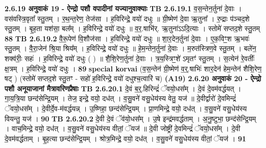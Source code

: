 \documentclass[17pt]{extarticle}
\begin{document}
                \textbf{ 2.6.19    अनुवाकं   19 - ऐन्द्रो पशौ वपादीनां यज्यानुवाक्याः} \newline
                                \textbf{ TB 2.6.19.1} \newline
                  व॒स॒न्तेन॒र्तुना॑ दे॒वाः । वस॑वस्त्रि॒वृता᳚ स्तु॒तम् । र॒थ॒न्त॒रेण॒ तेज॑सा । ह॒विरिन्द्रे॒ वयो॑ दधुः ॥ ग्री॒ष्मेण॑ दे॒वा ऋ॒तुना᳚ । रु॒द्राः प॑ञ्चद॒शे स्तु॒तम् । बृ॒ह॒ता यश॑सा॒ बल᳚म् । ह॒विरिन्द्रे॒ वयो॑ दधुः ॥ व॒र॒.षाभि॑र्. ऋ॒तुना॑ऽऽदि॒त्याः । स्तोमे॑ सप्तद॒शे स्तु॒तम् \textbf{ 88} \newline
                  \newline
                                \textbf{ TB 2.6.19.2} \newline
                  वै॒रू॒पेण॑ वि॒शौज॑सा । ह॒विरिन्द्रे॒ वयो॑ दधुः ॥ शा॒र॒देन॒र्तुना॑ दे॒वाः । ए॒क॒विꣳ॒॒श ऋ॒भवः॑ स्तु॒तम् । वै॒रा॒जेन॑ श्रि॒या श्रिय᳚म् । ह॒विरिन्द्रे॒ वयो॑ दधुः ॥ हे॒म॒न्तेन॒र्तुना॑ दे॒वाः । म॒रुत॑स्त्रिण॒वे स्तु॒तम् । बले॑न॒ शक्व॑रीः॒ सहः॑ । ह॒विरिन्द्रे॒ वयो॑ दधुः ( ) ॥ शै॒शि॒रेण॒र्तुना॑ दे॒वाः । त्र॒य॒स्त्रिꣳ॒॒शे॑ ऽमृतꣳ॑ स्तु॒तम् । स॒त्येन॑ रे॒वतीः᳚ क्ष॒त्रम् । ह॒विरिन्द्रे॒ वयो॑ दधुः । \textbf{ 89} \newline
                  \newline
                                                        \textbf{special korvai} \newline
              (व॒स॒न्तेन॑ ग्री॒ष्मेण॑ व॒र्॒.षाभिः॑ शार॒देन॑ हेम॒न्तेन॑ शैशि॒रेण॒ षट् ) \newline
                                (स्तोमे॑ सप्तद॒शे स्तु॒तꣳ - सहो॑ ह॒विरिन्द्रे॒ वयो॑ दधुश्च॒त्वारि॑ च) \textbf{(A19)} \newline \newline
                \textbf{ 2.6.20    अनुवाकं   20 - ऐन्द्रो पशौ अनूयाजानां मैत्रावरिणप्रैषाः} \newline
                                \textbf{ TB 2.6.20.1} \newline
                  दे॒वं ब॒र्॒.हिरिन्द्रं॑ ॅवयो॒धस᳚म् । दे॒वं दे॒वम॑वर्द्धयत् । गा॒य॒त्रि॒या छन्द॑सेन्द्रि॒यम् । तेज॒ इन्द्रे॒ वयो॒ दध॑त् । व॒सु॒वने॑ वसु॒धेय॑स्य वेतु॒ यज॑ ॥ दे॒वीर्द्वारो॑ दे॒वमिन्द्रं॑ ॅवयो॒धस᳚म् । दे॒वीर्दे॒व-म॑वर्द्धयन्न् । उ॒ष्णिहा॒ छन्द॑सेन्द्रि॒यम् । प्रा॒णमिन्द्रे॒ वयो॒ दध॑त् । व॒सु॒वने॑ वसु॒धेय॑स्य वियन्तु॒ यज॑ । \textbf{ 90} \newline
                  \newline
                                \textbf{ TB 2.6.20.2} \newline
                  दे॒वी दे॒वं ॅव॑यो॒धस᳚म् । उ॒षे इन्द्र॑मवर्द्धताम् । अ॒नु॒ष्टुभा॒ छन्द॑सेन्द्रि॒यम् । वाच॒मिन्द्रे॒ वयो॒ दध॑त् । व॒सु॒वने॑ वसु॒धेय॑स्य वीतां॒ ॅयज॑ ॥ दे॒वी जोष्ट्री॑ दे॒वमिन्द्रं॑ ॅवयो॒धस᳚म् । दे॒वी दे॒वम॑वर्द्धताम् । बृ॒ह॒त्या छन्द॑सेन्द्रि॒यम् । श्रोत्र॒मिन्द्रे॒ वयो॒ दध॑त् । व॒सु॒वने॑ वसु॒धेय॑स्य वीतां॒ ॅयज॑ । \textbf{ 91} \newline
\end{document}
